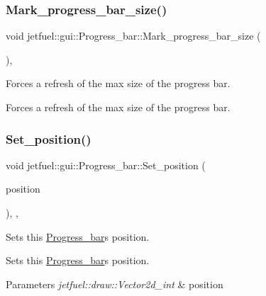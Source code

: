 \subsubsection{\texorpdfstring{Mark\+\_\+progress\+\_\+bar\+\_\+size()}{Mark\_progress\_bar\_size()}}
{\footnotesize\ttfamily void jetfuel\+::gui\+::\+Progress\+\_\+bar\+::\+Mark\+\_\+progress\+\_\+bar\+\_\+size (\begin{DoxyParamCaption}{ }\end{DoxyParamCaption})\hspace{0.3cm}{\ttfamily [inline]}, {\ttfamily [protected]}}



Forces a refresh of the max size of the progress bar. 

Forces a refresh of the max size of the progress bar. \mbox{\label{classjetfuel_1_1gui_1_1Progress__bar_a5f52369cccd805274805abf5913535df}} 
\subsubsection{\texorpdfstring{Set\+\_\+position()}{Set\_position()}}
{\footnotesize\ttfamily void jetfuel\+::gui\+::\+Progress\+\_\+bar\+::\+Set\+\_\+position (\begin{DoxyParamCaption}\item[{\hyperlink{classjetfuel_1_1draw_1_1Vector2d}{jetfuel\+::draw\+::\+Vector2d\+\_\+int}}]{position }\end{DoxyParamCaption})\hspace{0.3cm}{\ttfamily [inline]}, {\ttfamily [override]}, {\ttfamily [virtual]}}



Sets this \hyperlink{classjetfuel_1_1gui_1_1Progress__bar}{Progress\+\_\+bar}\textquotesingle{}s position. 

Sets this \hyperlink{classjetfuel_1_1gui_1_1Progress__bar}{Progress\+\_\+bar}\textquotesingle{}s position.


\begin{DoxyParams}{Parameters}
{\em jetfuel\+::draw\+::\+Vector2d\+\_\+int} & position \\
\hline
\end{DoxyParams}


